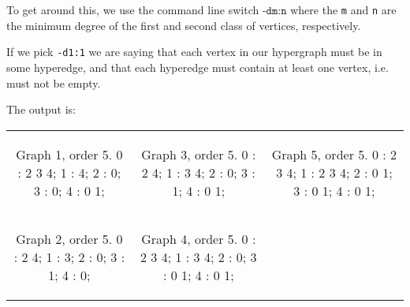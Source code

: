 To get around this, we use the command line switch $\texttt{-dm:n}$ where the \texttt{m} and \texttt{n} are the minimum degree of the first and second class of vertices, respectively.

If we pick \texttt{-d1:1} we are saying that each vertex in our hypergraph must be in some hyperedge, and that each hyperedge must contain at least one vertex, i.e. must not be empty.


The output is:

\begin{tabular}{|c|c|c|}

\begin{minipage}{1.5in}
\begin{datalisting}
Graph 1, order 5.
  0 : 2 3 4;
  1 : 4;
  2 : 0;
  3 : 0;
  4 : 0 1;

\end{datalisting}
\end{minipage}

&

\begin{minipage}{1.5in}
\begin{datalisting}
Graph 3, order 5.
  0 : 2 4;
  1 : 3 4;
  2 : 0;
  3 : 1;
  4 : 0 1;

\end{datalisting}
\end{minipage}

&

\begin{minipage}{1.5in}
\begin{datalisting}
Graph 5, order 5.
  0 : 2 3 4;
  1 : 2 3 4;
  2 : 0 1;
  3 : 0 1;
  4 : 0 1;
\end{datalisting}
\end{minipage}


\\

\begin{minipage}{1.5in}
\begin{datalisting}
Graph 2, order 5.
  0 : 2 4;
  1 : 3;
  2 : 0;
  3 : 1;
  4 : 0;

\end{datalisting}
\end{minipage}


&

\begin{minipage}{1.5in}
\begin{datalisting}
Graph 4, order 5.
  0 : 2 3 4;
  1 : 3 4;
  2 : 0;
  3 : 0 1;
  4 : 0 1;

\end{datalisting}
\end{minipage}


&


\\
\end{tabular}


